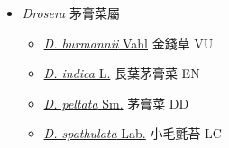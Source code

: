 
  \begin{itemize}
 \item[] \textit{Drosera} 茅膏菜屬
                    
  \begin{itemize}
        \item[] \href{http://www.theplantlist.org/tpl1.1/search?q=Drosera+burmannii}{\textit{D. burmannii} Vahl}   金錢草 VU
        \item[] \href{http://www.theplantlist.org/tpl1.1/search?q=Drosera+indica}{\textit{D. indica} L.}   長葉茅膏菜 EN
        \item[] \href{http://www.theplantlist.org/tpl1.1/search?q=Drosera+peltata}{\textit{D. peltata} Sm.}   茅膏菜 DD
        \item[] \href{http://www.theplantlist.org/tpl1.1/search?q=Drosera+spathulata}{\textit{D. spathulata} Lab.}   小毛氈苔 LC
  \end{itemize}
  \end{itemize}
